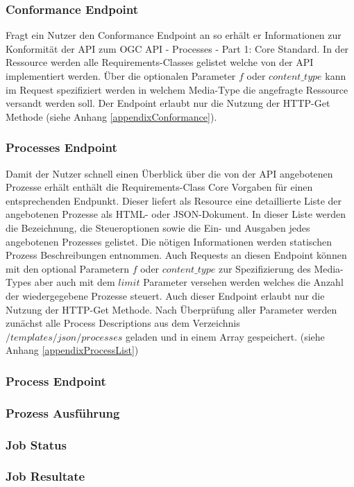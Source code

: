 \subsubsection{Conformance Endpoint}
Fragt ein Nutzer den Conformance Endpoint an so erhält er Informationen zur Konformität der API zum OGC API - Processes - Part 1: Core Standard. 
In der Ressource werden alle Requirements-Classes gelistet welche von der API implementiert werden. Über die optionalen Parameter $f$ oder $content\_type$ kann
im Request spezifiziert werden in welchem Media-Type die angefragte Ressource versandt werden soll. Der Endpoint erlaubt nur die Nutzung der HTTP-Get Methode
(siehe Anhang \ref{appendixConformance}). 

\subsubsection{Processes Endpoint}
Damit der Nutzer schnell einen Überblick über die von der API angebotenen Prozesse erhält enthält die Requirements-Class Core Vorgaben für einen entsprechenden Endpunkt.
Dieser liefert als Resource eine detaillierte Liste der angebotenen Prozesse als HTML- oder JSON-Dokument. In dieser Liste werden die Bezeichnung, die Steueroptionen sowie
die Ein- und Ausgaben jedes angebotenen Prozesses gelistet. Die nötigen Informationen werden statischen Prozess Beschreibungen entnommen.
Auch Requests an diesen Endpoint können mit den optional Parametern $f$ oder $content\_type$ zur Spezifizierung des Media-Types aber auch mit dem $limit$ Parameter versehen werden 
welches die Anzahl der wiedergegebene Prozesse steuert. Auch dieser Endpoint erlaubt nur die Nutzung der HTTP-Get Methode. 
Nach Überprüfung aller Parameter werden zunächst alle Process Descriptions aus dem Verzeichnis $/templates/json/processes$ geladen und in einem Array gespeichert.
(siehe Anhang \ref{appendixProcessList})

\subsubsection{Process Endpoint}
\subsubsection{Prozess Ausführung}
\subsubsection{Job Status}
\subsubsection{Job Resultate}
